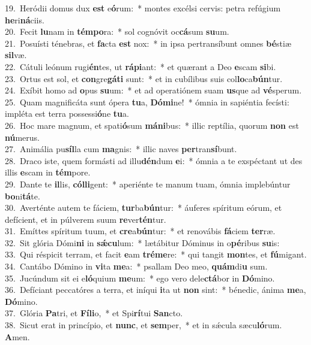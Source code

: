 {19.~}Heródii domus dux \textbf{est} e\textbf{ó}rum:~* montes excélsi cervis: petra refúgium \textbf{he}ri\textbf{ná}ciis.\\
{20.~}Fecit \textbf{lu}nam in \textbf{tém}\textbf{po}ra:~* sol cognóvit oc\textbf{cá}sum \textbf{su}um.\\
{21.~}Posuísti ténebras, et \textbf{fa}cta \textbf{est} nox:~* in ipsa pertransíbunt omnes \textbf{bé}stiæ \textbf{sil}væ.\\
{22.~}Cátuli leónum rugi\textbf{én}tes, ut \textbf{rá}\textbf{pi}ant:~* et quærant a Deo \textbf{e}scam \textbf{si}bi.\\
{23.~}Ortus est sol, et \textbf{con}gre\textbf{gá}\textbf{ti} sunt:~* et in cubílibus suis col\textbf{lo}ca\textbf{bún}tur.\\
{24.~}Exíbit homo ad \textbf{o}pus \textbf{su}um:~* et ad operatiónem suam \textbf{us}que ad \textbf{vé}sperum.\\
{25.~}Quam magnificáta sunt ópera \textbf{tu}a, \textbf{Dó}\textbf{mi}ne!~* ómnia in sapiéntia fecísti: impléta est terra possessi\textbf{ó}ne \textbf{tu}a.\\
{26.~}Hoc mare magnum, et spati\textbf{ó}sum \textbf{má}\textbf{ni}bus:~* illic reptília, quorum \textbf{non} est \textbf{nú}merus.\\
{27.~}Animália pu\textbf{síl}la cum \textbf{ma}gnis:~* illic naves \textbf{per}tran\textbf{sí}bunt.\\
{28.~}Draco iste, quem formásti ad illu\textbf{dén}dum \textbf{e}i:~* ómnia a te exspéctant ut des illis \textbf{e}scam in \textbf{tém}pore.\\
{29.~}Dante te \textbf{il}lis, \textbf{cól}\textbf{li}gent:~* aperiénte te manum tuam, ómnia implebúntur \textbf{bo}ni\textbf{tá}te.\\
{30.~}Averténte autem te fáciem, \textbf{tur}ba\textbf{bún}tur:~* áuferes spíritum eórum, et defícient, et in púlverem suum \textbf{re}ver\textbf{tén}tur.\\
{31.~}Emíttes spíritum tuum, et \textbf{cre}a\textbf{bún}tur:~* et renovábis \textbf{fá}ciem \textbf{ter}ræ.\\
{32.~}Sit glória Dómi\textbf{ni} in \textbf{sǽ}\textbf{cu}lum:~* lætábitur Dóminus in o\textbf{pé}ribus \textbf{su}is:\\
{33.~}Qui réspicit terram, et facit \textbf{e}am \textbf{tré}\textbf{me}re:~* qui tangit \textbf{mon}tes, et \textbf{fú}migant.\\
{34.~}Cantábo Dómino in \textbf{vi}ta \textbf{me}a:~* psallam Deo meo, \textbf{quám}di\textbf{u} sum.\\
{35.~}Jucúndum sit ei e\textbf{ló}quium \textbf{me}um:~* ego vero dele\textbf{ctá}bor in \textbf{Dó}mino.\\
{36.~}Defíciant peccatóres a terra, et iníqui \textbf{i}ta ut \textbf{non} sint:~* bénedic, ánima \textbf{me}a, \textbf{Dó}mino.\\
{37.~}Glória \textbf{Pa}tri, et \textbf{Fí}\textbf{li}o,~* et Spi\textbf{rí}tui \textbf{San}cto.\\
{38.~}Sicut erat in princípio, et \textbf{nunc}, et \textbf{sem}per,~* et in sǽcula sæcu\textbf{ló}rum. \textbf{A}men.\\
